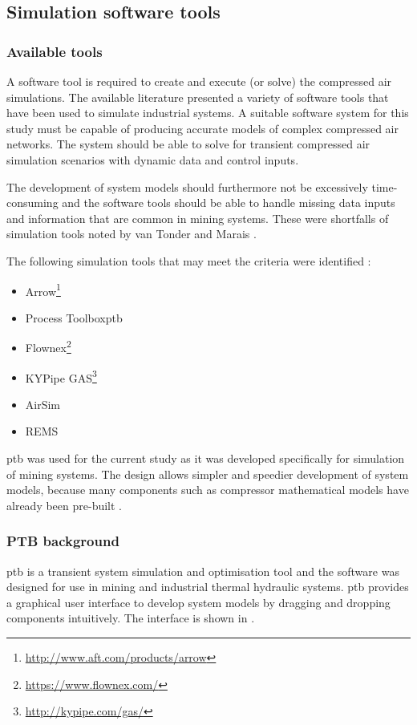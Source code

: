 \subsection{Simulation software tools}
\subsubsection{Available tools}
A software tool is required to create and execute (or solve) the compressed air simulations. The available literature presented a variety of software tools that have been used to simulate industrial systems. A suitable software system for this study must be capable of producing accurate models of complex compressed air networks. The system should be able to solve for transient compressed air simulation scenarios with dynamic data and control inputs.
\clearpage
\par 
The development of system models should furthermore not be excessively time-consuming and the software tools should be able to handle missing data inputs and information that are common in mining systems. These were shortfalls of simulation tools noted by van Tonder \cite{vanTonder2014PhD} and Marais \cite{Mare2016PhD}.
\par
The following simulation tools that may meet the criteria were identified : 
\begin{itemize}
	\item Arrow\footnote{\url{http://www.aft.com/products/arrow}}
	\item Process Toolbox\gls{ptb}
	\item Flownex\footnote{\url{https://www.flownex.com/}}
	\item KYPipe GAS\footnote{\url{http://kypipe.com/gas/}}
	\item AirSim
	\item REMS
\end{itemize}
 \gls{ptb} was used for the current study as it was developed specifically for simulation of mining systems. The design allows simpler and speedier development of system models, because many components such as compressor mathematical models have already been pre-built \cite{Mare2016PhD}. 
 \subsubsection{PTB background}
 \gls*{ptb} is a transient system simulation and optimisation tool and the software was designed for use in mining and industrial thermal hydraulic systems. \gls{ptb} provides a graphical user interface to develop system models by dragging and dropping components intuitively. The interface is shown in .
 \par 


